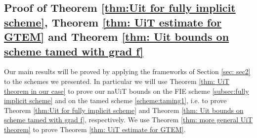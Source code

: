 \documentclass[reqno, 11pt]{amsart}
\theoremstyle{plain}
\theoremstyle{definition}
\theoremstyle{remark}
\numberwithin{equation}{section}
\numberwithin{theorem}{section}
\DeclareMathOperator{\dist}{dist}
\newcommand{\R}{\mathbb{R}}
\begin{document}
{


\subsection{Proof of  Theorem \ref{thm:Uit for fully implicit scheme}, Theorem \ref{thm: UiT estimate for GTEM} and Theorem \ref{thm: Uit bounds on scheme tamed with grad f}}\label{subsec: 4.1}
Our main results will be proved by applying the frameworks of Section \ref{sec: sec2} to the schemes we presented. In particular we will use Theorem \ref{thm: UiT theorem in our case} to prove our naUiT bounds on the FIE scheme \eqref{subsec:fully implicit scheme} and on the tamed scheme \eqref{scheme:taming1}, i.e. to prove Theorem \ref{thm:Uit for fully implicit scheme} and Theorem \ref{thm: Uit bounds on scheme tamed with grad f}, respectively. We  use Theorem \ref{thm: more general UiT theorem} to prove Theorem \ref{thm: UiT estimate for GTEM}.   

}
\end{document}
